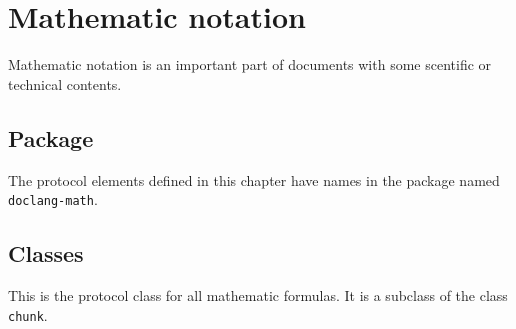 \chapter{Mathematic notation}
\label{chap-mathematic-notation}

Mathematic notation is an important part of documents with some
scentific or technical contents.

\section{Package}

The protocol elements defined in this chapter have names in the
package named \texttt{doclang-math}.

\section{Classes}


This is the protocol class for all mathematic formulas.  It is a
subclass of the class \texttt{chunk}.








